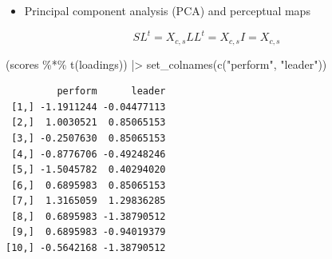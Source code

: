 \documentclass[
  ignorenonframetext,
]{beamer}
\newenvironment{Shaded}{\begin{snugshade}}{\end{snugshade}}
\newcommand{\FunctionTok}[1]{\textcolor[rgb]{0.28,0.35,0.67}{#1}}
\newcommand{\NormalTok}[1]{\textcolor[rgb]{0.00,0.23,0.31}{#1}}
\newcommand{\SpecialCharTok}[1]{\textcolor[rgb]{0.37,0.37,0.37}{#1}}
\newcommand{\StringTok}[1]{\textcolor[rgb]{0.13,0.47,0.30}{#1}}
\providecommand{\tightlist}{%
  \setlength{\itemsep}{0pt}\setlength{\parskip}{0pt}}\usepackage{longtable,booktabs,array}
\begin{document}
\begin{frame}[fragile]{}
\label{section-35}
\begin{itemize}
\item
  Principal component analysis (PCA) and perceptual maps

\end{itemize}

\[SL^t = X_{c, s}LL^t = X_{c, s}I= X_{c, s}\]

\tiny

\begin{Shaded}
\begin{Highlighting}[]
\NormalTok{(scores }\SpecialCharTok{\%*\%} \FunctionTok{t}\NormalTok{(loadings)) }\SpecialCharTok{|\textgreater{}} \FunctionTok{set\_colnames}\NormalTok{(}\FunctionTok{c}\NormalTok{(}\StringTok{"perform"}\NormalTok{, }\StringTok{"leader"}\NormalTok{))}
\end{Highlighting}
\end{Shaded}

\begin{verbatim}
         perform      leader
 [1,] -1.1911244 -0.04477113
 [2,]  1.0030521  0.85065153
 [3,] -0.2507630  0.85065153
 [4,] -0.8776706 -0.49248246
 [5,] -1.5045782  0.40294020
 [6,]  0.6895983  0.85065153
 [7,]  1.3165059  1.29836285
 [8,]  0.6895983 -1.38790512
 [9,]  0.6895983 -0.94019379
[10,] -0.5642168 -1.38790512
\end{verbatim}
\end{frame}
\end{document}

